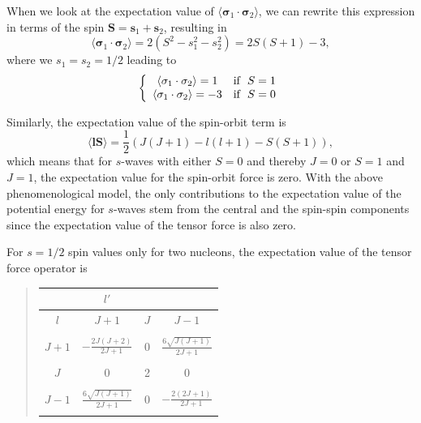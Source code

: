 \documentclass[%
oneside,                 %
final,                   %
10pt]{article}
\begin{document}
When we look at the expectation value of 
$\langle \mathbf{\sigma}_1\cdot\mathbf{\sigma}_2\rangle$, we can rewrite this expression in terms of the
spin $\mathbf{S}=\mathbf{s}_1+\mathbf{s}_2$, resulting in 
\[
\langle\mathbf{\sigma}_1\cdot\mathbf{\sigma}_2\rangle=2(S^2-s_1^2-s_2^2)=2S(S+1)-3,
\]
where we $s_1=s_2=1/2$ leading to
\[
\left\{ \begin{array}{cc} \langle\mathbf{\sigma}_1\cdot\mathbf{\sigma}_2\rangle=1 &  \mathrm{if} \hspace{0.2cm} S=1\\
\langle\mathbf{\sigma}_1\cdot\mathbf{\sigma}_2\rangle=-3 & \mathrm{if} \hspace{0.2cm} S=0\\\end{array}\right.
\]

Similarly, the expectation value of the spin-orbit term is 
\[
\langle \mathbf{l}\mathbf{S} \rangle = \frac{1}{2}\left( J(J+1)-l(l+1)-S(S+1)\right),
\]
which means that for $s$-waves with either $S=0$ and thereby $J=0$ or $S=1$ and $J=1$, 
the expectation value for the
spin-orbit force is zero. With the above phenomenological model, the
only contributions to the expectation value of the potential energy for $s$-waves
stem  from the central and the spin-spin components since the
expectation value of the tensor force is also zero.

 For $s=1/2$ spin values only for two nucleons, the expectation value of the tensor force operator is 


\begin{quote}
\begin{tabular}{cccc}
\hline
\multicolumn{1}{c}{  } & \multicolumn{1}{c}{ $l'$ } & \multicolumn{1}{c}{  } & \multicolumn{1}{c}{  } \\
\hline
$l$   & $J+1$                         & $J$ & $J-1$                         \\
\hline
      &                               &     &                               \\
$J+1$ & $-\frac{2J(J+2)}{2J+1}$       & 0   & $\frac{6\sqrt{J(J+1)}}{2J+1}$ \\
      &                               &     &                               \\
$J$   & 0                             & 2   & 0                             \\
      &                               &     &                               \\
$J-1$ & $\frac{6\sqrt{J(J+1)}}{2J+1}$ & 0   & $-\frac{2(2J+1)}{2J+1}$       \\
      &                               &     &                               \\
\hline
\end{tabular}
\end{quote}
\end{document}
